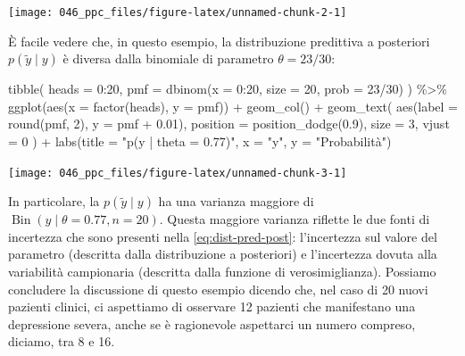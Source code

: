 \documentclass[
  10pt,
  italian,
  a4paper,
  extrafontsizes,onecolumn,openright
  ]{memoir}
\newenvironment{Shaded}{\begin{snugshade}}{\end{snugshade}}
\newcommand{\AttributeTok}[1]{\textcolor[rgb]{0.77,0.63,0.00}{#1}}
\newcommand{\DecValTok}[1]{\textcolor[rgb]{0.00,0.00,0.81}{#1}}
\newcommand{\FloatTok}[1]{\textcolor[rgb]{0.00,0.00,0.81}{#1}}
\newcommand{\FunctionTok}[1]{\textcolor[rgb]{0.00,0.00,0.00}{#1}}
\newcommand{\NormalTok}[1]{#1}
\newcommand{\SpecialCharTok}[1]{\textcolor[rgb]{0.00,0.00,0.00}{#1}}
\newcommand{\StringTok}[1]{\textcolor[rgb]{0.31,0.60,0.02}{#1}}
\DeclareMathOperator{\Bin}{Bin} %
\begin{document}
\begin{center}\texttt{[image: 046\_ppc\_files/figure-latex/unnamed-chunk-2-1]} \end{center}

\noindent
È facile vedere che, in questo esempio, la distribuzione predittiva a posteriori \(p(\tilde{y} \mid y)\) è diversa dalla binomiale di parametro \(\theta = 23/30\):

\begin{Shaded}
\begin{Highlighting}[]
\FunctionTok{tibble}\NormalTok{(}
  \AttributeTok{heads =} \DecValTok{0}\SpecialCharTok{:}\DecValTok{20}\NormalTok{, }
  \AttributeTok{pmf =} \FunctionTok{dbinom}\NormalTok{(}\AttributeTok{x =} \DecValTok{0}\SpecialCharTok{:}\DecValTok{20}\NormalTok{, }\AttributeTok{size =} \DecValTok{20}\NormalTok{, }\AttributeTok{prob =} \DecValTok{23}\SpecialCharTok{/}\DecValTok{30}\NormalTok{)}
\NormalTok{) }\SpecialCharTok{\%\textgreater{}\%}
\FunctionTok{ggplot}\NormalTok{(}\FunctionTok{aes}\NormalTok{(}\AttributeTok{x =} \FunctionTok{factor}\NormalTok{(heads), }\AttributeTok{y =}\NormalTok{ pmf)) }\SpecialCharTok{+}
  \FunctionTok{geom\_col}\NormalTok{() }\SpecialCharTok{+}
  \FunctionTok{geom\_text}\NormalTok{(}
    \FunctionTok{aes}\NormalTok{(}\AttributeTok{label =} \FunctionTok{round}\NormalTok{(pmf, }\DecValTok{2}\NormalTok{), }\AttributeTok{y =}\NormalTok{ pmf }\SpecialCharTok{+} \FloatTok{0.01}\NormalTok{),}
    \AttributeTok{position =} \FunctionTok{position\_dodge}\NormalTok{(}\FloatTok{0.9}\NormalTok{),}
    \AttributeTok{size =} \DecValTok{3}\NormalTok{,}
    \AttributeTok{vjust =} \DecValTok{0}
\NormalTok{  ) }\SpecialCharTok{+}
  \FunctionTok{labs}\NormalTok{(}\AttributeTok{title =} \StringTok{"p(y | theta = 0.77)"}\NormalTok{,}
       \AttributeTok{x =} \StringTok{"y"}\NormalTok{,}
       \AttributeTok{y =} \StringTok{"Probabilità"}\NormalTok{) }
\end{Highlighting}
\end{Shaded}

\begin{center}\texttt{[image: 046\_ppc\_files/figure-latex/unnamed-chunk-3-1]} \end{center}

\noindent
In particolare, la \(p(\tilde{y} \mid y)\) ha una varianza maggiore di \(\Bin(y \mid \theta = 0.77, n = 20)\). Questa maggiore varianza riflette le due fonti di incertezza che sono presenti nella \eqref{eq:dist-pred-post}: l'incertezza sul valore del parametro (descritta dalla distribuzione a posteriori) e l'incertezza dovuta alla variabilità campionaria (descritta dalla funzione di verosimiglianza).
Possiamo concludere la discussione di questo esempio dicendo che, nel caso di 20 nuovi pazienti clinici, ci aspettiamo di osservare 12 pazienti che manifestano una depressione severa, anche se è ragionevole aspettarci un numero compreso, diciamo, tra 8 e 16.
\end{document}
